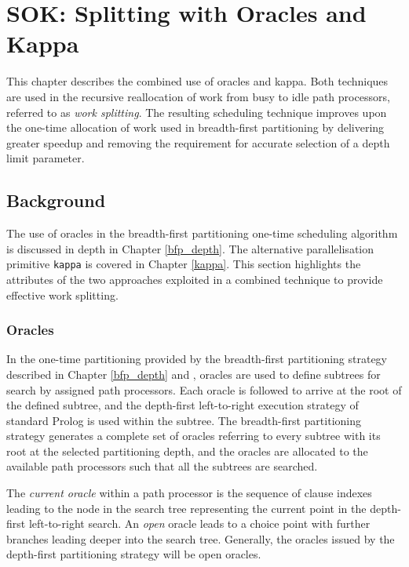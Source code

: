 \chapter{SOK: Splitting with Oracles and Kappa}
\label{sok}

This chapter describes the combined use of oracles and kappa.
Both techniques are used in the recursive reallocation of work from busy to
idle path processors, referred to as \textit{work splitting}.  The resulting
scheduling technique improves upon the one-time allocation of work used in
breadth-first partitioning by delivering greater speedup and removing the requirement
for accurate selection of a depth limit parameter.

\section{Background} %

The use of oracles in the breadth-first partitioning one-time scheduling algorithm is
discussed in depth in Chapter \ref{bfp_depth}.  The alternative parallelisation primitive
\texttt{kappa} is covered in Chapter \ref{kappa}.  This section highlights the attributes
of the two approaches exploited in a combined technique to provide effective work splitting.

\subsection{Oracles}

In the one-time partitioning provided by the breadth-first partitioning strategy
described in Chapter \ref{bfp_depth} and \cite{Sar95}, oracles are used to define subtrees
for search by assigned path processors.  Each oracle is followed to arrive at the root
of the defined subtree, and the depth-first left-to-right execution strategy of standard
Prolog is used within the subtree.  The breadth-first partitioning strategy generates
a complete set of oracles referring to every subtree with its root at the selected
partitioning depth, and the oracles are allocated to the available path processors
such that all the subtrees are searched.

The \textit{current oracle} within a path processor is the sequence of clause indexes
leading to the node in the search tree representing the current point in the
depth-first left-to-right search.
An \textit{open} oracle leads to a choice point
with further branches leading deeper into the search tree.  Generally, the oracles
issued by the depth-first partitioning strategy will be open oracles.

